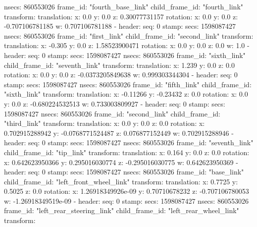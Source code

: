        nsecs: 860553026
      frame_id: "fourth_base_link"
    child_frame_id: "fourth_link"
    transform: 
      translation: 
        x: 0.0
        y: 0.0
        z: 0.30077731157
      rotation: 
        x: 0.0
        y: 0.0
        z: -0.707106781185
        w: 0.707106781188
  - 
    header: 
      seq: 0
      stamp: 
        secs: 1598087427
        nsecs: 860553026
      frame_id: "first_link"
    child_frame_id: "second_link"
    transform: 
      translation: 
        x: -0.305
        y: 0.0
        z: 1.58523900471
      rotation: 
        x: 0.0
        y: 0.0
        z: 0.0
        w: 1.0
  - 
    header: 
      seq: 0
      stamp: 
        secs: 1598087427
        nsecs: 860553026
      frame_id: "sixth_link"
    child_frame_id: "seventh_link"
    transform: 
      translation: 
        x: 1.239
        y: 0.0
        z: 0.0
      rotation: 
        x: 0.0
        y: 0.0
        z: -0.0373205849638
        w: 0.999303344304
  - 
    header: 
      seq: 0
      stamp: 
        secs: 1598087427
        nsecs: 860553026
      frame_id: "fifth_link"
    child_frame_id: "sixth_link"
    transform: 
      translation: 
        x: -0.11266
        y: -0.23432
        z: 0.0
      rotation: 
        x: 0.0
        y: 0.0
        z: -0.680224532513
        w: 0.733003809927
  - 
    header: 
      seq: 0
      stamp: 
        secs: 1598087427
        nsecs: 860553026
      frame_id: "second_link"
    child_frame_id: "third_link"
    transform: 
      translation: 
        x: 0.0
        y: 0.0
        z: 0.0
      rotation: 
        x: 0.702915288942
        y: -0.0768771524487
        z: 0.076877152449
        w: 0.702915288946
  - 
    header: 
      seq: 0
      stamp: 
        secs: 1598087427
        nsecs: 860553026
      frame_id: "seventh_link"
    child_frame_id: "tip_link"
    transform: 
      translation: 
        x: 0.164
        y: 0.0
        z: 0.0
      rotation: 
        x: 0.642623950366
        y: 0.295016030774
        z: -0.295016030775
        w: 0.642623950369
  - 
    header: 
      seq: 0
      stamp: 
        secs: 1598087427
        nsecs: 860553026
      frame_id: "base_link"
    child_frame_id: "left_front_wheel_link"
    transform: 
      translation: 
        x: 0.7725
        y: 0.5025
        z: 0.0
      rotation: 
        x: 1.26918349926e-09
        y: 0.70710678232
        z: -0.707106780053
        w: -1.26918349519e-09
  - 
    header: 
      seq: 0
      stamp: 
        secs: 1598087427
        nsecs: 860553026
      frame_id: "left_rear_steering_link"
    child_frame_id: "left_rear_wheel_link"
    transform: 

